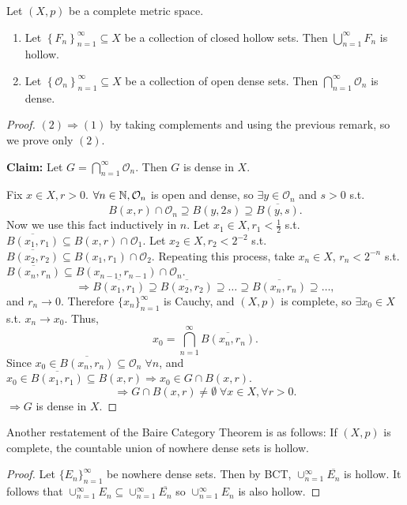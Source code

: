 \begin{thm}
    Let $(X, p)$ be a complete metric space.
    \begin{enumerate}
        \item Let $\left\{ F_n \right\}_{n =1}^{\infty} \subseteq X$ be a collection of closed hollow sets. 
        Then $\bigcup_{n = 1}^{\infty} F_n$ is hollow.   
        \item Let $\left\{ \mathcal{O}_n \right\}_{n = 1}^{\infty} \subseteq X$ be a collection of 
        open dense sets. Then $\bigcap_{n = 1}^{\infty} \mathcal{O}_n$ is dense. 
    \end{enumerate}
\end{thm}

\begin{proof}
    $(2) \Rightarrow (1)$ by taking complements and using the previous remark, so we prove only $(2)$.
    
    \medskip
    \noindent \textbf{Claim:} Let $G = \bigcap_{n =1}^{\infty} \mathcal{O}_n$. Then $G$ is dense in $X$.
    
    \medskip
    \noindent Fix $x \in X, r > 0$. $\forall n \in \mathbb{N}, \mathcal{O}_n$ is open and dense, so 
    $\exists y \in \mathcal{O}_n$ and $s > 0$ s.t. 
    \[
    B(x, r) \cap \mathcal{O}_n \supseteq B(y, 2s) \supseteq \overline{B(y, s)}.
    \]
    Now we use this fact inductively in $n$. Let 
    $x_1 \in X, r_1 < \frac{1}{2}$ s.t. $\overline{B(x_1, r_1)} \subseteq B(x, r) \cap \mathcal{O}_1$.
    Let $x_2 \in X, r_2 < 2^{-2}$ s.t. $\overline{B(x_2, r_2)} \subseteq B(x_1, r_1) \cap \mathcal{O}_2$.
    Repeating this process, take $x_n \in X$, $r_n < 2^{-n}$ s.t. $\overline{B(x_n, r_n)} 
    \subseteq B(x_{n - 1}, r_{n -1}) \cap \mathcal{O}_n$. 
    \[
    \Rightarrow \overline{B(x_1, r_1)} \supseteq \overline{B(x_2, r_2)} 
    \supseteq \dots \supseteq \overline{B(x_n, r_n)} \supseteq \dots,
    \]
    and $r_n \to 0$. Therefore $\{x_{n}\}_{n=1}^{\infty} $ is Cauchy, and $(X, p)$ is complete, 
    so $\exists x_0 \in X$ s.t. $x_n \to x_0$. Thus, 
    \[
    x_0 = \bigcap_{n = 1}^{\infty} \overline{B(x_n, r_n)}.
    \]
    Since $x_0 \in \overline{B(x_n, r_n)} \subseteq \mathcal{O}_n \; \forall n$, and $x_0 \in 
    \overline{B(x_1, r_1)} \subseteq B(x, r) \Rightarrow x_0 \in G \cap B(x, r)$.
    \[
    \Rightarrow G \cap B(x, r) \neq \emptyset \; \forall x \in X, \forall r > 0.
    \]
    $\Rightarrow G$ is dense in $X$.
\end{proof}

Another restatement of the Baire Category Theorem is as follows: 
If $(X, p)$ is complete, the countable union of nowhere dense sets is hollow.
\begin{proof}
    Let $\{E_{n}\}_{n=1}^{\infty} $ be nowhere dense sets. Then by BCT, $\cup_{n = 1}^{\infty}
    \overline{E_n}$ is hollow. It follows that $\cup_{n = 1}^{\infty} E_n \subseteq 
    \cup_{n = 1}^{\infty} \overline{E_n}$  so $\cup_{n = 1}^{\infty} E_n$ is also hollow. 
\end{proof}  


